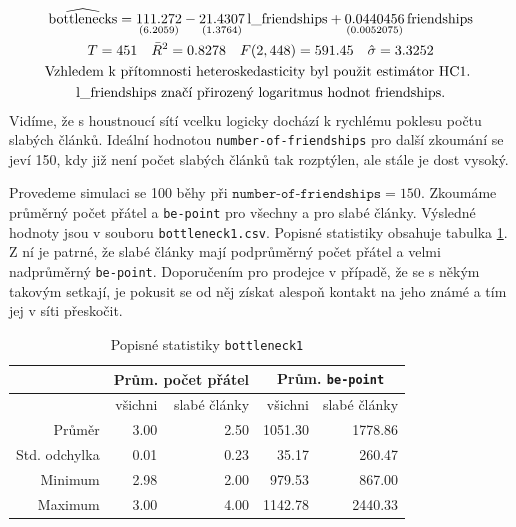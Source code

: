\documentclass[a4wide,12pt]{report}
\begin{document}
\begin{gather}
\widehat{\rm bottlenecks} = 
\underset{(6.2059)}{111.272}
-\underset{(1.3764)}{21.4307}\,\mbox{l\_friendships}
+\underset{(0.0052075)}{0.0440456}\,\mbox{friendships}
 \notag \\
T = 451 \quad \bar{R}^2 = 0.8278 \quad F(2,448) = 591.45 \quad \hat{\sigma} = 3.3252 \notag \\
\text{Vzhledem k přítomnosti heteroskedasticity byl použit estimátor HC1. } \notag \\
\text{\mbox{l\_friendships} značí přirozený logaritmus hodnot \mbox{friendships}.} \notag
\end{gather}
Vidíme, že s houstnoucí sítí vcelku logicky dochází k rychlému poklesu počtu slabých článků. Ideální hodnotou \texttt{number-of-friendships} pro další zkoumání se jeví 150, kdy již není počet slabých článků tak rozptýlen, ale stále je dost vysoký.

Provedeme simulaci se 100 běhy při $\texttt{number-of-friendships}=150$. Zkoumáme průměrný počet přátel a \texttt{be-point} pro všechny a pro slabé články. Výsledné hodnoty jsou v souboru \texttt{bottleneck1.csv}. Popisné statistiky obsahuje tabulka \ref{tab:bottleneck1_desc}. Z ní je patrné, že slabé články mají podprůměrný počet přátel a velmi nadprůměrný \texttt{be-point}. Doporučením pro prodejce v případě, že se s někým takovým setkají, je pokusit se od něj získat alespoň kontakt na jeho známé a tím jej v síti přeskočit.
\begin{table}[h]
  \begin{center}
  \begin{tabular}{|r|r|r|r|r|}
  \hline
   & \multicolumn{2}{|c|}{Prům. počet přátel} & \multicolumn{2}{|c|}{Prům. \texttt{be-point}} \\\hline
	  &všichni	&slabé články	&všichni	&slabé články\\\hline
  Průměr	&3.00	&2.50	&1051.30	&1778.86\\
  Std. odchylka	&0.01	&0.23	&35.17	&260.47\\
  Minimum	&2.98	&2.00	&979.53	&867.00\\
  Maximum	&3.00	&4.00	&1142.78	&2440.33\\\hline
  \end{tabular}
  \end{center}
  \caption{Popisné statistiky \texttt{bottleneck1}}
  \label{tab:bottleneck1_desc}
\end{table}
\end{document}
